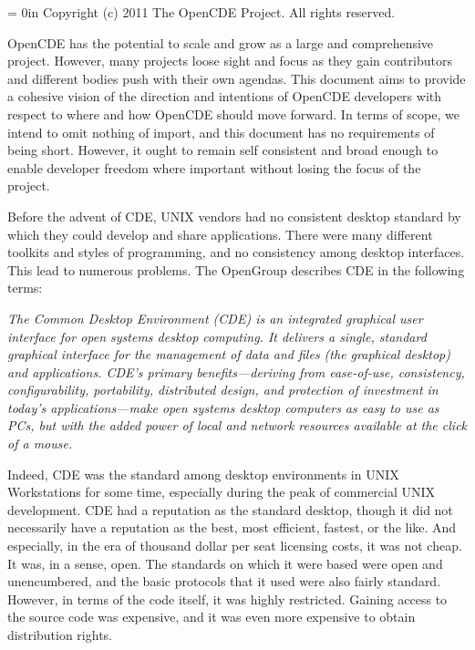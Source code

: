 \vfill

\noindent
{\leftskip = 0in
Copyright (c) 2011 The OpenCDE Project. All rights reserved.\par}
\break


OpenCDE has the potential to scale and grow as a large and
comprehensive project. However, many projects loose sight and focus as
they gain contributors and different bodies push with their own agendas.
This document aims to provide a cohesive vision of the direction and
intentions of OpenCDE developers with respect to where and how OpenCDE
should move forward. In terms of scope, we intend to omit nothing of
import, and this document has no requirements of being short. However, it
ought to remain self consistent and broad enough to enable developer
freedom where important without losing the focus of the project.


Before the advent of CDE, UNIX vendors had no consistent desktop
standard by which they could develop and share applications. There were
many different toolkits and styles of programming, and no consistency
among desktop interfaces. This lead to numerous problems. The OpenGroup
describes CDE in the following terms:

\medskip
{\narrower\it
The Common Desktop Environment (CDE) is an integrated graphical user
interface for open systems desktop computing. It delivers a single,
standard graphical interface for the management of data and files (the
graphical desktop) and applications. CDE’s primary benefits—deriving
from ease-of-use, consistency, configurability, portability, distributed
design, and protection of investment in today’s applications—make open
systems desktop computers as easy to use as PCs, but with the added
power of local and network resources available at the click of a mouse.%
\par}
\medskip

\noindent
Indeed, CDE was the standard among desktop environments in UNIX 
Workstations for some time, especially during the peak of commercial
UNIX development. CDE had a reputation as the standard desktop, though
it did not necessarily have a reputation as the best, most efficient,
fastest, or the like. And especially, in the era of thousand dollar
per seat licensing costs, it was not cheap. It was, in a sense, open. The
standards on which it were based were open and unencumbered, and the
basic protocols that it used were also fairly standard. However, in
terms of the code itself, it was highly restricted. Gaining access to the
source code was expensive, and it was even more expensive to obtain
distribution rights.


